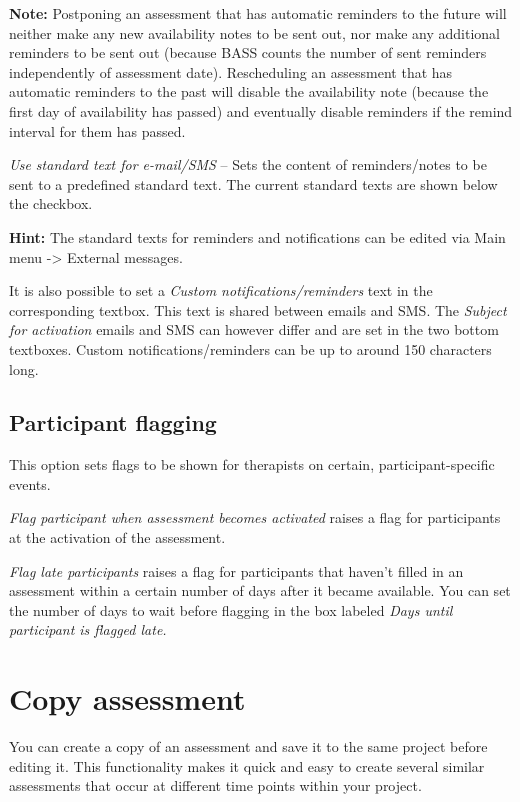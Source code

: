 \documentclass[]{book}
\begin{document}
\textbf{Note:} Postponing an assessment that has automatic reminders to the future will neither make any new availability notes to be sent out, nor make any additional reminders to be sent out (because BASS counts the number of sent reminders independently of assessment date). Rescheduling an assessment that has automatic reminders to the past will disable the availability note (because the first day of availability has passed) and eventually disable reminders if the remind interval for them has passed.

\emph{Use standard text for e-mail/SMS} -- Sets the content of reminders/notes to be sent to a predefined standard text. The current standard texts are shown below the checkbox.

\textbf{Hint:} The standard texts for reminders and notifications can be edited via Main menu -\textgreater{} External messages.

It is also possible to set a \emph{Custom notifications/reminders} text in the corresponding textbox. This text is shared between emails and SMS. The \emph{Subject for activation} emails and SMS can however differ and are set in the two bottom textboxes. Custom notifications/reminders can be up to around 150 characters long.

\hypertarget{participant-flagging}{%
\subsection{Participant flagging}\label{participant-flagging}}

This option sets flags to be shown for therapists on certain, participant-specific events.

\emph{Flag participant when assessment becomes activated} raises a flag for participants at the activation of the assessment.

\emph{Flag late participants} raises a flag for participants that haven't filled in an assessment within a certain number of days after it became available. You can set the number of days to wait before flagging in the box labeled \emph{Days until participant is flagged late.}

\hypertarget{copy-assessment}{%
\section{Copy assessment}\label{copy-assessment}}

You can create a copy of an assessment and save it to the same project before editing it. This functionality makes it quick and easy to create several similar assessments that occur at different time points within your project.
\end{document}
